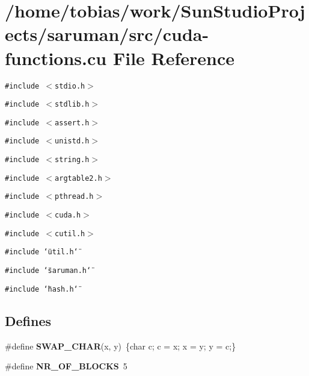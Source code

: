 \section{/home/tobias/work/SunStudioProjects/saruman/src/cuda-functions.cu File Reference}
\label{cuda-functions_8cu}
{\tt \#include $<$stdio.h$>$}\par
{\tt \#include $<$stdlib.h$>$}\par
{\tt \#include $<$assert.h$>$}\par
{\tt \#include $<$unistd.h$>$}\par
{\tt \#include $<$string.h$>$}\par
{\tt \#include $<$argtable2.h$>$}\par
{\tt \#include $<$pthread.h$>$}\par
{\tt \#include $<$cuda.h$>$}\par
{\tt \#include $<$cutil.h$>$}\par
{\tt \#include \char`\"{}util.h\char`\"{}}\par
{\tt \#include \char`\"{}saruman.h\char`\"{}}\par
{\tt \#include \char`\"{}hash.h\char`\"{}}\par
\subsection*{Defines}
\begin{CompactItemize}
\item 
\#define {\bf SWAP\_\-CHAR}(x, y)~\{char c; c = x; x = y; y = c;\}
\item 
\#define {\bf NR\_\-OF\_\-BLOCKS}~5
\end{CompactItemize}
